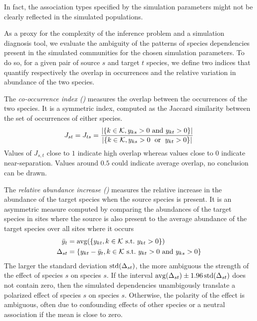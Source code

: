 \documentclass[10pt,a4paper]{article}
\begin{document}
In fact, the association types specified by the simulation parameters might not be clearly reflected in the simulated populations.

As a proxy for the complexity of the inference problem and a simulation diagnosis tool, we evaluate the ambiguity of the patterns of species dependencies present in the simulated communities for the chosen simulation parameters. To do so, for a given pair of source $s$ and target $t$ species, we define two indices that quantify respectively the overlap in occurrences and the relative variation in abundance of the two species.  

The \emph{co-occurrence index (\evJoc)} measures the overlap between the occurrences of the two species.
It is a symmetric index, computed as the Jaccard similarity between the set of occurrences of either species.
\begin{equation*}
J_{st} = J_{ts} = \dfrac{\left\lvert\{k \in \mathcal{K},  y_{k s} > 0 \text{ and } y_{k t} > 0\}\right\rvert}{\left\lvert\{k \in \mathcal{K},  y_{k s} > 0 \text{ \;or\; } y_{k t} > 0\}\right\rvert}
\end{equation*}
Values of $J_{s,t}$ close to $1$ indicate high overlap whereas values close to $0$ indicate near-separation. Values around $0.5$ could indicate average overlap, no conclusion can be drawn.  

The \emph{relative abundance increase (\evRAI)} measures the relative increase in the abundance of the target species when the source species is present. It is an asymmetric measure computed by comparing the abundances of the target species in sites where the source is also present to the average abundance of the target species over all sites where it occurs
\begin{align*}
  \bar{y}_{t} & = \operatorname{avg}(\{ y_{k t},  k \in \mathcal{K}\text{ s.t.\ }y_{k t} > 0\}) \\
  \Delta_{st} & = \{ y_{k t} - \bar{y}_{t},  k \in \mathcal{K}\text{ s.t.\ }y_{k t} > 0 \text{ and } y_{k s} > 0\}
\end{align*}
The larger the standard deviation $\operatorname{std}(\Delta_{st})$, the more ambiguous the strength of the effect of species $s$ on species $s$.
If the interval $\operatorname{avg}(\Delta_{st}) \pm 1.96 \operatorname{std}(\Delta_{st})$ does not contain zero, then the simulated dependencies unambigously translate a polarized effect of species $s$ on species $s$. Otherwise, the polarity of the effect is ambiguous, often due to confounding effects of other species or a neutral association if the mean is close to zero.
\end{document}
